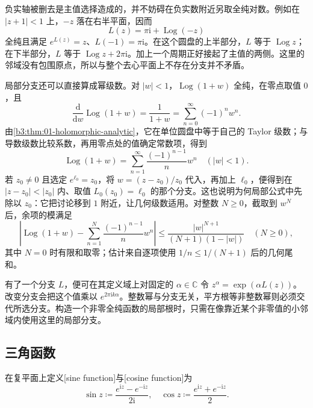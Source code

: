 负实轴被删去是主值选择造成的，并不妨碍在负实数附近另取全纯对数。例如在 \(|z+1|<1\) 上，\(-z\) 落在右半平面，因而
\[
 L(z)=\pi\mathrm{i}+\operatorname{Log}(-z)
\]
全纯且满足 \(e^{L(z)}=z\)、\(L(-1)=\pi\mathrm{i}\)。在这个圆盘的上半部分，\(L\) 等于 \(\operatorname{Log}z\)；在下半部分，\(L\) 等于 \(\operatorname{Log}z+2\pi\mathrm{i}\)。加上一个周期正好接起了主值的两侧。这里的邻域没有包围原点，所以与整个去心平面上不存在分支并不矛盾。

\ProseParagraphBreak

局部分支还可以直接算成幂级数。对 \(|w|<1\)，\(\operatorname{Log}(1+w)\) 全纯，在零点取值 \(0\)，且
\[
 \frac{\mathrm{d}}{\mathrm{d}w}\operatorname{Log}(1+w)
 =\frac1{1+w}=\sum_{n=0}^{\infty}(-1)^nw^n.
\]
由\cref{b3:thm:01-holomorphic-analytic}，它在单位圆盘中等于自己的 Taylor 级数；与导数级数比较系数，再用零点处的值确定常数项，得到
\begin{equation}\label{b3:eq:01-local-log-series}
 \operatorname{Log}(1+w)
 =\sum_{n=1}^{\infty}\frac{(-1)^{n-1}}n w^n
 \quad(|w|<1).
\end{equation}
若 \(z_0\ne0\) 且选定 \(e^{\ell_0}=z_0\)，将
\(w=(z-z_0)/z_0\) 代入，再加上 \(\ell_0\)，便得到在 \(|z-z_0|<|z_0|\) 内、取值 \(L_0(z_0)=\ell_0\) 的那个分支。这也说明为何局部公式中先除以 \(z_0\)：它把讨论移到 \(1\) 附近，让几何级数适用。对整数 \(N\ge0\)，截取到 \(w^N\) 后，余项的模满足
\[
 \left|\operatorname{Log}(1+w)
 -\sum_{n=1}^{N}\frac{(-1)^{n-1}}n w^n\right|
 \le\frac{|w|^{N+1}}{(N+1)(1-|w|)}
 \quad(N\ge0),
\]
其中 \(N=0\) 时有限和取零；估计来自逐项使用 \(1/n\le1/(N+1)\) 后的几何尾和。

有了一个分支 \(L\)，便可在其定义域上对固定的 \(\alpha\in\mathbb C\) 令 \(z^{\alpha}=\exp(\alpha L(z))\)。改变分支会把这个值乘以 \(e^{2\pi\mathrm{i}k\alpha}\)。整数幂与分支无关，平方根等非整数幂则必须交代所选分支。构造一个非零全纯函数的局部根时，只需在像靠近某个非零值的小邻域内使用这里的局部分支。

\subsection{三角函数}
\label{b3:subsec:010303}

\begin{definition}
\label{b3:def:01-elementary-trigonometric}
在复平面上定义[sine function]与[cosine function]为
\[
\sin z\coloneqq\frac{e^{\mathrm{i}z}-e^{-\mathrm{i}z}}{2\mathrm{i}},
\quad \cos z\coloneqq\frac{e^{\mathrm{i}z}+e^{-\mathrm{i}z}}2.
\]
\end{definition}

